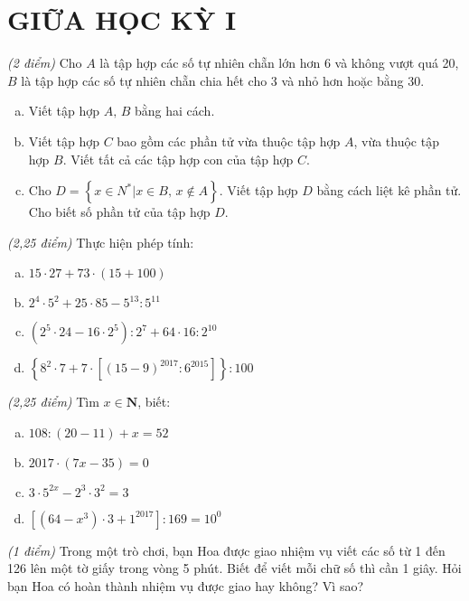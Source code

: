 \section{GIỮA HỌC KỲ I}
\setcounter{ex}{0}
\begin{ex} \textit{(2 điểm)} Cho $A$ là tập hợp các số tự nhiên chẵn lớn hơn 6 và không vượt quá 20, $B$ là tập hợp các số tự nhiên chẵn chia hết cho 3 và nhỏ hơn hoặc bằng 30.
\begin{enumerate} [a)]
\item Viết tập hợp $A,\,B$ bằng hai cách.
\item Viết tập hợp $C$ bao gồm các phần tử vừa thuộc tập hợp $A$, vừa thuộc tập hợp $B$. Viết tất cả các tập hợp con của tập hợp $C$.
\item Cho $D=\left\{ x\in {{N}^{*}}|x\in B,\,x\notin A \right\}$. Viết tập hợp $D$ bằng cách liệt kê phần tử. Cho biết số phần tử của tập hợp $D$. 
\end{enumerate}
\end{ex}    \begin{ex}  \textit{(2,25 điểm)} Thực hiện phép tính:
\begin{enumerate} [a)]
\item $15\cdot 27+73\cdot \left( 15+100 \right)$ 
\item ${{2}^{4}}\cdot {{5}^{2}}+25\cdot 85-{{5}^{13}}:{{5}^{11}}$
\item $\left( {{2}^{5}}\cdot 24-16\cdot {{2}^{5}} \right):{{2}^{7}}+64\cdot 16:{{2}^{10}}$ 
\item $\left\{ {{8}^{2}}\cdot 7+7\cdot \left[ {{\left( 15-9 \right)}^{2017}}:{{6}^{2015}} \right] \right\}:100$ 
\end{enumerate}
\end{ex}    \begin{ex}  \textit{(2,25 điểm)} Tìm $x \in  \mathbf{N}$, biết:
 \begin{enumerate}[a)]
\item $108:\left( 20-11 \right)+x=52$ 
\item $2017\cdot \left( 7x-35 \right)=0$ 
\item $3\cdot {{5}^{2x}}-{{2}^{3}}\cdot {{3}^{2}}=3$ 
\item $\left[ \left( 64-{{x}^{3}} \right)\cdot 3+{{1}^{2017}} \right]:169={{10}^{0}}$ 
\end{enumerate}
\end{ex}    \begin{ex}  \textit{(1 điểm)} Trong một trò chơi, bạn Hoa được giao nhiệm vụ viết các số từ 1 đến 126 lên một tờ giấy trong vòng 5 phút. Biết để viết mỗi chữ số thì cần 1 giây. Hỏi bạn Hoa có hoàn thành nhiệm vụ được giao hay không? Vì sao?\\

\end{ex}
